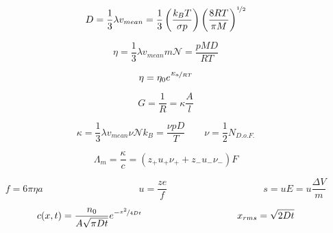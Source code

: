\documentclass[12pt, letterpaper]{memoir}
\begin{document}
\noindent
\begin{minipage}[t]{0.5\linewidth}
	\begin{equation*}
		D=\frac{1}{3}\lambda v_{mean}=\frac{1}{3}\left(\frac{k_BT}{\sigma p}\right)\left(\frac{8RT}{\pi M}\right)^{\nicefrac{1}{2}}
	\end{equation*}
\end{minipage}
\begin{minipage}[t]{0.5\linewidth}
	\begin{equation*}
		\eta = \frac{1}{3}\lambda v_{mean}m\mathcal{N}=\frac{pMD}{RT}
	\end{equation*}
\end{minipage}

\noindent
\begin{minipage}[t]{0.5\linewidth}	
	\begin{equation*}
		\eta=\eta_0e^{\nicefrac{E_a}{RT}}
	\end{equation*}
	
	\begin{equation*}
		G=\frac{1}{R}=\kappa\frac{A}{l}
	\end{equation*}	
\end{minipage}
\begin{minipage}[t]{0.5\linewidth}	
	\begin{equation*}
		\kappa = \frac{1}{3} \lambda v_{mean}\nu\mathcal{N}k_B =  \frac{\nu pD}{T} \hspace{2em} \nu=\frac{1}{2}N_{D.o.F.}
	\end{equation*}
	
	\begin{equation*}
		\Lambda_m = \frac{\kappa}{c}=\left(z_+u_+\nu_++z_-u_-\nu_-\right)F
	\end{equation*}
\end{minipage}

\begin{equation*}
	f=6\pi\eta a \hspace{10em} u = \frac{ze}{f} \hspace{10em} s=uE=u\frac{\Delta V}{m}
\end{equation*}

\begin{equation*}
	c(x,t)=\frac{n_0}{A\sqrt{\pi Dt}}e^{-\nicefrac{x^2}{4Dt}} \hspace{10em} x_{rms}=\sqrt{2Dt}
\end{equation*}
\end{document}
